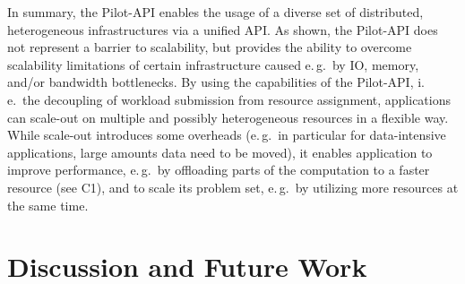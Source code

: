 \documentclass[conference]{IEEEtran}
\begin{document}
  
In summary, the Pilot-API
enables the usage of a diverse set of distributed, heterogeneous
infrastructures via a unified API. As shown, the Pilot-API does not
represent a barrier to scalability, but provides the ability to
overcome scalability limitations of certain infrastructure caused
e.\,g.\ by IO, memory, and/or bandwidth bottlenecks. By using the
capabilities of the Pilot-API, i.\,e.\ the decoupling of workload
submission from resource assignment, applications can scale-out on
multiple and possibly heterogeneous resources in a flexible way. While
scale-out introduces some overheads (e.\,g.\ in particular for
data-intensive applications, large amounts data need to be moved), it
enables application to improve performance, e.\,g.\ by offloading
parts of the computation to a faster resource (see C1), and to scale
its problem set, e.\,g.\ by utilizing more resources at the same time.






% 
% 



\section{Discussion and Future Work}
\label{sec:discussion-future-work}

\end{document}
